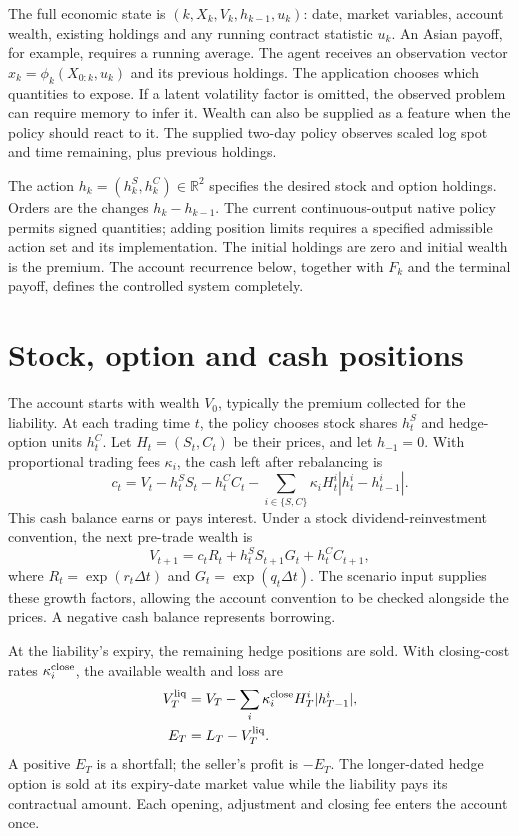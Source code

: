 \documentclass[8pt]{strategynet-journal}
\begin{document}
\begin{SNcolumns}
The full economic state is $(k,X_k,V_k,h_{k-1},u_k)$: date, market variables,
account wealth, existing holdings and any running contract statistic $u_k$.
An Asian payoff, for example, requires a running average. The agent receives
an observation vector $x_k=\phi_k(X_{0:k},u_k)$ and its previous holdings.
The application chooses which quantities to expose. If a latent volatility
factor is omitted, the observed problem can require memory to infer it.
Wealth can also be supplied as a feature when the policy should react to it.
The supplied two-day policy observes scaled log spot and time remaining,
plus previous holdings.

The action $h_k=(h_k^S,h_k^C)\in\mathbb R^2$ specifies the desired stock
and option holdings. Orders are the changes $h_k-h_{k-1}$. The current
continuous-output native policy permits signed quantities; adding position
limits requires a specified admissible action set and its implementation.
The initial holdings are zero and initial wealth is the premium. The account
recurrence below, together with $F_k$ and the terminal payoff, defines the
controlled system completely.

\section{Stock, option and cash positions}
The account starts with wealth $V_0$, typically the premium collected for the
liability. At each trading time $t$, the policy chooses stock shares $h_t^S$
and hedge-option units $h_t^C$. Let $H_t=(S_t,C_t)$ be their prices, and let
$h_{-1}=0$. With proportional trading fees $\kappa_i$, the cash left after
rebalancing is
\begin{equation}
 c_t=V_t-h_t^S S_t-h_t^C C_t
       -\sum_{i\in\{S,C\}}\kappa_i H_t^i|h_t^i-h_{t-1}^i|.
\end{equation}
This cash balance earns or pays interest. Under a stock dividend-reinvestment
convention, the next pre-trade wealth is
\begin{equation}
 V_{t+1}=c_t R_t+h_t^S S_{t+1}G_t+h_t^C C_{t+1},
\end{equation}
where $R_t=\exp(r_t\Delta t)$ and $G_t=\exp(q_t\Delta t)$. The scenario input
supplies these growth factors, allowing the account convention to be checked
alongside the prices. A negative cash balance represents borrowing.

At the liability's expiry, the remaining hedge positions are sold. With
closing-cost rates $\kappa_i^{\rm close}$, the available wealth and loss are
\begin{align}
 V_T^{\rm liq}&=V_T-\sum_i\kappa_i^{\rm close}H_T^i|h_{T-1}^i|,\\
 E_T&=L_T-V_T^{\rm liq}.
\end{align}
A positive $E_T$ is a shortfall; the seller's profit is $-E_T$.
The longer-dated hedge option is sold at its expiry-date market value while
the liability pays its contractual amount. Each opening, adjustment and
closing fee enters the account once.


\end{SNcolumns}
\end{document}
